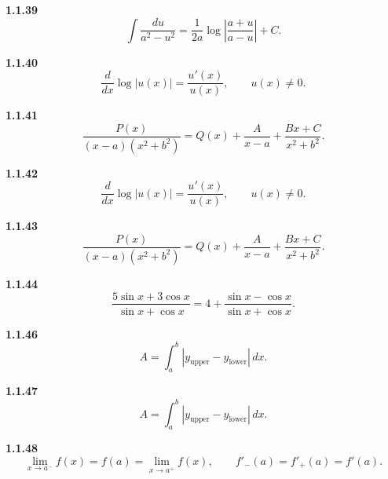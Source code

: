 \noindent\textbf{1.1.39}\quad
\begin{equation}
\int\frac{du}{a^2-u^2}
=\frac1{2a}\log\left|\frac{a+u}{a-u}\right|+C.
\tag{1.1.39.1}\label{eq:int-rational-39}
\end{equation}

\noindent\textbf{1.1.40}\quad
\begin{equation}
\frac{d}{dx}\log|u(x)|=\frac{u'(x)}{u(x)},\qquad u(x)\ne0.
\tag{1.1.40.1}\label{eq:log-derivative-40}
\end{equation}

\noindent\textbf{1.1.41}\quad
\begin{equation}
\frac{P(x)}{(x-a)(x^2+b^2)}
=Q(x)+\frac{A}{x-a}+\frac{Bx+C}{x^2+b^2}.
\tag{1.1.41.1}\label{eq:partial-fractions-41}
\end{equation}

\noindent\textbf{1.1.42}\quad
\begin{equation}
\frac{d}{dx}\log|u(x)|=\frac{u'(x)}{u(x)},\qquad u(x)\ne0.
\tag{1.1.42.1}\label{eq:log-derivative-42}
\end{equation}

\noindent\textbf{1.1.43}\quad
\begin{equation}
\frac{P(x)}{(x-a)(x^2+b^2)}
=Q(x)+\frac{A}{x-a}+\frac{Bx+C}{x^2+b^2}.
\tag{1.1.43.1}\label{eq:partial-fractions-43}
\end{equation}

\noindent\textbf{1.1.44}\quad
\begin{equation}
\frac{5\sin x+3\cos x}{\sin x+\cos x}
=4+\frac{\sin x-\cos x}{\sin x+\cos x}.
\tag{1.1.44.1}\label{eq:trig-split-44}
\end{equation}

\noindent\textbf{1.1.46}\quad
\begin{equation}
A=\int_a^b|y_{\mathrm{upper}}-y_{\mathrm{lower}}|\,dx.
\tag{1.1.46.1}\label{eq:area-between-46}
\end{equation}

\noindent\textbf{1.1.47}\quad
\begin{equation}
A=\int_a^b|y_{\mathrm{upper}}-y_{\mathrm{lower}}|\,dx.
\tag{1.1.47.1}\label{eq:area-between-47}
\end{equation}

\noindent\textbf{1.1.48}\quad
\begin{equation}
\lim_{x\to a^-}f(x)=f(a)=\lim_{x\to a^+}f(x),\qquad
f'_{-}(a)=f'_{+}(a)=f'(a).
\tag{1.1.48.1}\label{eq:continuity-differentiability-48}
\end{equation}

